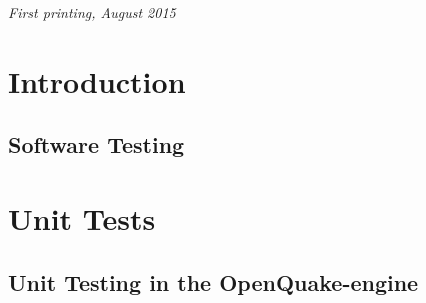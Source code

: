 \documentclass[11pt,fleqn]{book} %
\begin{document}
\noindent \textit{First printing, August 2015} %


\pagestyle{empty} %
\tableofcontents %
\cleardoublepage %
\pagestyle{fancy} %

% 


\part{Introduction}

\chapter{Software Testing}
   \label{chap:intro}
   

\thispagestyle{empty}
\part{Unit Tests}

\chapter{Unit Testing in the OpenQuake-engine}
   \label{chap:unit-tests}
   
   \cleardoublepage
\end{document}
